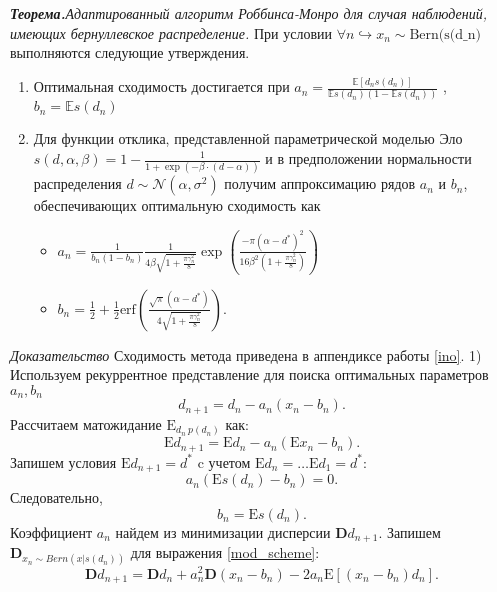 \documentclass{mipt-thesis-bs}
\begin{document}
\textit{\textbf{Теорема.}Адаптированный алгоритм Роббинса-Монро для случая наблюдений, имеющих бернуллевское распределение.} \label{algo} 
При условии $\forall n \hookrightarrow x_n \sim \text{Bern(s(d_n)}$ выполняются следующие утверждения. \begin{enumerate}
    \item Оптимальная сходимость достигается при $a_n = \frac{\mathbb{E}[d_n s(d_n)]}{\mathbb{E}s(d_n)(1 - \mathbb{E}s(d_n))}$ , $b_n =\mathbb{E} s(d_n)$
    \item Для функции отклика, представленной параметрической моделью Эло $s(d,\alpha,\beta) = 1 - \frac{1}{1+\exp\left(-\beta \cdot(d -\alpha)\right)}$
     и в предположении нормальности распределения $d \sim \mathcal{N}(\alpha,\sigma^2)$ получим аппроксимацию рядов $a_n$ и $b_n$, обеспечивающих оптимальную сходимость как\begin{itemize}
        \item $a_n = \frac{1}{b_n(1-b_n)} \frac{1}{4  \beta \sqrt{1+\frac{\pi\gamma_n^2}{8}}} \exp\left( \frac{- \pi (\alpha-d^*)^2}{16  \beta^2 ( 1+\frac{\pi\gamma_n^2}{8})}\right)$
        \item $b_n = \frac{1}{2} + \frac{1}{2} \text{erf}\left(\frac{\sqrt{\pi} (\alpha-d^*)}{4 \sqrt{1+\frac{\pi\gamma_n^2}{8}}} \right)$.
    \end{itemize} 
\end{enumerate}
\textit{Доказательство}
Сходимость метода приведена в аппендиксе работы \ref{ino}.
1) Используем рекуррентное представление для поиска оптимальных параметров $a_n,b_n$
\begin{equation}
    d_{n+1} = d_n -  a_n(x_n-b_n).
    \label{mod_scheme}
\end{equation}
Рассчитаем матожидание $\mathrm{E}_{d_n ~ p(d_n)}$ как:
\begin{equation}
    \mathrm{E} d_{n+1} = \mathrm{E} d_n -  a_n(\mathrm{E}x_n-b_n).
\end{equation}
Запишем условия $\mathrm{E} d_{n+1} = d^*$ c учетом $\mathrm{E} d_{n} = \dots \mathrm{E} d_{1}= d^*$:
\begin{equation}
    a_n (\mathrm{E} s(d_n) - b_n)  =0.
\end{equation}
Следовательно,
\begin{equation}
    \label{b_n}
    b_n = \mathrm{E} s(d_n).
\end{equation}
Коэффициент $a_n$ найдем из минимизации дисперсии $\mathbf{D} d_{n+1}$. Запишем $\mathbf{D}_{x_n \sim Bern(x | s(d_n))}$ для выражения \ref{mod_scheme}:
\begin{equation}
    \label{disp}
    \mathbf{D} d_{n+1} = \mathbf{D} d_n + a_n^2 \mathbf{D} (x_n-b_n)  - 2 a_n \mathrm{E}\left[(x_n-b_n)d_n\right].
\end{equation}
\end{document}
